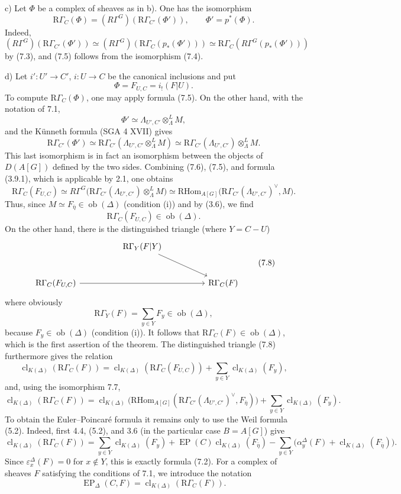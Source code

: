 \documentclass[11pt]{article}
\providecommand{\RHom}{\mathrm{RHom}}
\providecommand{\EP}{\operatorname{EP}}
\providecommand{\Ob}{\operatorname{ob}}
\providecommand{\RHom}{\mathrm{RHom}}
\providecommand{\RHom}{\mathrm R\mathcal{H}om}
\providecommand{\Ob}{\operatorname{ob}}
\providecommand{\EP}{\operatorname{EP}}
\providecommand{\Ob}{\operatorname{Ob}}
\providecommand{\clK}[1]{\operatorname{cl}_{K(#1)}}
\providecommand{\RG}{\mathrm R\Gamma}
\providecommand{\RHom}{\mathrm{RHom}}
\providecommand{\Ob}{\operatorname{ob}}
\providecommand{\Ob}{\operatorname{Ob}}
\begin{document}
c) Let $\Phi$ be a complex of sheaves as in b). One has the isomorphism
\[
\RG_C(\Phi)=(R\Gamma^G)(\RG_{C'}(\Phi')),
\qquad \Phi'=p^*(\Phi).
\tag{7.5}
\]
Indeed,
\[
(R\Gamma^G)(\RG_{C'}(\Phi'))
\simeq
(R\Gamma^G)(\RG_C(p_*(\Phi')))
\simeq
\RG_C(R\Gamma^G(p_*(\Phi')))
\]
by (7.3), and (7.5) follows from the isomorphism (7.4).

d) Let $i':U'\to C'$, $i:U\to C$ be the canonical inclusions and put
\[
\Phi=F_{U,C}=i_!(F|U).
\]
To compute $\RG_C(\Phi)$, one may apply formula (7.5). On the other hand, with the notation of 7.1,
\[
\Phi'\simeq \Lambda_{U',C'}\otimes_\Lambda^L M,
\]
and the Künneth formula (SGA 4 XVII) gives
\[
\RG_{C'}(\Phi')
\simeq
\RG_{C'}(\Lambda_{U',C'}\otimes_\Lambda^L M)
\simeq
\RG_{C'}(\Lambda_{U',C'})\otimes_\Lambda^L M.
\tag{7.6}
\]
This last isomorphism is in fact an isomorphism between the objects of $D(A[G])$ defined by the two sides. Combining (7.6), (7.5), and formula (3.9.1), which is applicable by 2.1, one obtains
\[
\RG_C(F_{U,C})
\simeq
R\Gamma^G\bigl(\RG_{C'}(\Lambda_{U',C'})\otimes_\Lambda^L M\bigr)
\simeq
\RHom_{A[G]}\bigl(\RG_{C'}(\Lambda_{U',C'})^\vee,M\bigr).
\tag{7.7}
\]
Thus, since $M\simeq F_{\bar\eta}\in\Ob(\Delta)$ (condition (i)) and by (3.6), we find
\[
\RG_C(F_{U,C})\in\Ob(\Delta).
\]
On the other hand, there is the distinguished triangle (where $Y=C-U$)
\[
\begin{tikzcd}[column sep=huge,row sep=large]
& \RG_Y(F|Y) \arrow[dr] & \\
\RG_C(F_{U,C}) \arrow[rr] && \RG_C(F)
\end{tikzcd}
\tag{7.8}
\]
where obviously
\[
\RG_Y(F)=\sum_{y\in Y}F_y\in\Ob(\Delta),
\]
because $F_y\in\Ob(\Delta)$ (condition (i)). It follows that $\RG_C(F)\in\Ob(\Delta)$, which is the first assertion of the theorem. The distinguished triangle (7.8) furthermore gives the relation
\[
\clK{\Delta}(\RG_C(F))
=
\clK{\Delta}(\RG_C(F_{U,C}))
+\sum_{y\in Y}\clK{\Delta}(F_y),
\]
and, using the isomorphism 7.7,
\[
\clK{\Delta}(\RG_C(F))
=
\clK{\Delta}\bigl(\RHom_{A[G]}(\RG_{C'}(\Lambda_{U',C'})^\vee,F_{\bar\eta})\bigr)
+\sum_{y\in Y}\clK{\Delta}(F_y).
\]
To obtain the Euler--Poincaré formula it remains only to use the Weil formula (5.2). Indeed, first 4.4, (5.2), and 3.6 (in the particular case $B=A[G]$) give
\[
\clK{\Delta}(\RG_C(F))
=
\sum_{y\in Y}\clK{\Delta}(F_y)
+\EP(C)\clK{\Delta}(F_{\bar\eta})
-\sum_{y\in Y}\bigl(\alpha_y^\Delta(F)+\clK{\Delta}(F_{\bar\eta})\bigr).
\]
Since $\varepsilon_x^\Delta(F)=0$ for $x\notin Y$, this is exactly formula (7.2). For a complex of sheaves $F$ satisfying the conditions of 7.1, we introduce the notation
\[
\EP_\Delta(C,F)=\clK{\Delta}(\RG_C(F)).
\]
\end{document}

